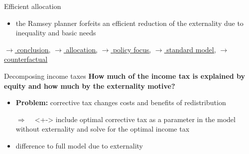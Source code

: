 \documentclass[11pt,aspectratio=169]{beamer}
\newcommand{\tr}[1]{\textcolor{blue}{#1}}
\newcommand{\ar}{$\Rightarrow$ \ }
\begin{document}
\begin{frame}{Efficient allocation}
\begin{itemize}
		\item<1-> the Ramsey planner forfeits an efficient reduction of the externality due to inequality and basic needs
	\end{itemize}
	\vspace{-2mm}
	\hfill		
	\hyperlink{conc}{\tiny{$\rightarrow$ conclusion,}}
	\hyperlink{effallo}{\tiny{$\rightarrow$ allocation,}} \hyperlink{backpol}{\tiny{$\rightarrow$ policy focus,}}
	\hyperlink{skipallo}{\tiny{$\rightarrow$ standard model,}}
	\hypertarget{backeff}{}
	\hyperlink{moreaggtaun}{\tiny{$\rightarrow$ counterfactual}}
\end{frame}

	
	\begin{frame}{Decomposing income taxes} 
		\alert{\textbf{How much of the income tax is explained by equity and how much by the externality motive?}}
		\pause
		\vspace{3mm}
		\begin{itemize}
			\item<+-> \textbf{Problem:} corrective tax changes costs and benefits of redistribution %
			\vspace{3mm}
			\item[\ar]<+-> include optimal corrective tax as a parameter in the model without externality  and solve for the optimal income tax %
			\vspace{3mm}
			\item<+-> difference to full model due to externality 
		\end{itemize}
	\end{frame}
	
\end{document}
